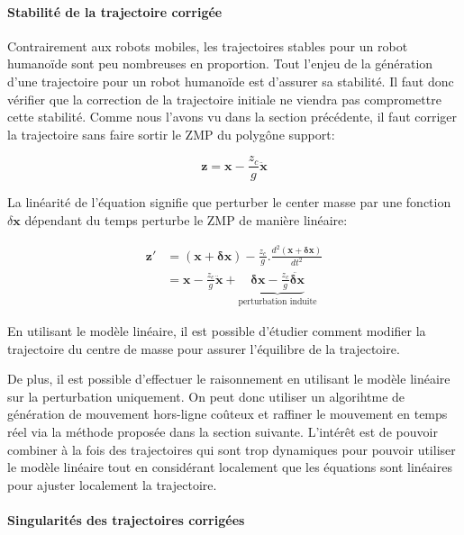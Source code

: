 \paragraph{Stabilité de la trajectoire corrigée}


Contrairement aux robots mobiles, les trajectoires stables pour un
robot humanoïde sont peu nombreuses en proportion. Tout l'enjeu de la
génération d'une trajectoire pour un robot humanoïde est d'assurer sa
stabilité. Il faut donc vérifier que la correction de la trajectoire
initiale ne viendra pas compromettre cette stabilité. Comme nous
l'avons vu dans la section précédente, il faut corriger la trajectoire
sans faire sortir le ZMP du polygône support:

\begin{equation} \label{eq:zmp2}
  \mathbf{z} = \mathbf{x}  - \frac{z_c}{g} \ddot{\mathbf{x}}
\end{equation}

La linéarité de l'équation signifie que perturber le center masse par
une fonction \mbox{$\delta \mathbf{x}$} dépendant du temps perturbe le
ZMP de manière linéaire:

\begin{equation} \label{eq:zmpperturbation}
\begin{split}
  \mathbf{z'} &= (\mathbf{x} + \mathbf{\delta x}) - \frac{z_c}{g} .
  \frac{d^2 (\mathbf{x} + \mathbf{\delta x})}{d t^2}\\
  &= \mathbf{x} - \frac{z_c}{g} \ddot{\mathbf{x}} +
  \underbrace{\mathbf{\delta x} - \frac{z_c}{g} \ddot{\mathbf{\delta
        x}}}_{\text{perturbation induite}}
\end{split}
\end{equation}

En utilisant le modèle linéaire, il est possible d'étudier comment
modifier la trajectoire du centre de masse pour assurer l'équilibre de
la trajectoire.

De plus, il est possible d'effectuer le raisonnement en utilisant le
modèle linéaire sur la perturbation uniquement. On peut donc utiliser
un algorihtme de génération de mouvement hors-ligne coûteux et
raffiner le mouvement en temps réel via la méthode proposée dans la
section suivante. L'intérêt est de pouvoir combiner à la fois des
trajectoires qui sont trop dynamiques pour pouvoir utiliser le modèle
linéaire tout en considérant localement que les équations sont
linéaires pour ajuster localement la trajectoire.


\paragraph{Singularités des trajectoires corrigées}


